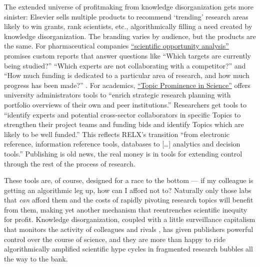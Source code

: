 The extended universe of profitmaking from knowledge disorganization
gets more sinister: Elsevier sells multiple products to recommend
`trending' research areas likely to win grants, rank scientists, etc.,
algorithmically filling a need created by knowledge disorganization. The
branding varies by audience, but the products are the same. For
pharmaceutical companies
\href{https://www.elsevier.com/solutions/professional-services/drug-design-optimization\#opportunity}{``scientific
opportunity analysis''} promises custom reports that answer questions
like ``Which targets are currently being studied?'' ``Which experts are
not collaborating with a competitor?'' and ``How much funding is
dedicated to a particular area of research, and how much progress has
been made?'' \citep{elsevierDrugDesignOptimization} . For
academics,
\href{https://www.elsevier.com/solutions/scival/features/topic-prominence-in-science\#how}{``Topic
Prominence in Science''} offers university administrators tools to
``enrich strategic research planning with portfolio overviews of their
own and peer institutions.'' Researchers get tools to ``identify experts
and potential cross-sector collaborators in specific Topics to
strengthen their project teams and funding bids and identify Topics
which are likely to be well funded.'' \citep{elsevierTopicProminenceScienceb}  This reflects RELX's transition
``from electronic reference, information reference tools, databases to
{[}\ldots{]} analytics and decision tools.'' \citep{relxRELX2020Results2021}  Publishing is old news, the real money is
in tools for extending control through the rest of the process of
research.

These tools are, of course, designed for a race to the bottom --- if my
colleague is getting an algorithmic leg up, how can I afford not to?
Naturally only those labs that \emph{can} afford them and the costs of
rapidly pivoting research topics will benefit from them, making yet
another mechanism that reentrenches scientific inequity for profit.
Knowledge disorganization, coupled with a little surveillance capitalism
that monitors the activity of colleagues and rivals \citep{brembsReplacingAcademicJournals2021, hansonUserTrackingAcademic2019} ,
has given publishers powerful control over the course of science, and
they are more than happy to ride algorithmically amplified scientific
hype cycles in fragmented research bubbles all the way to the bank.

